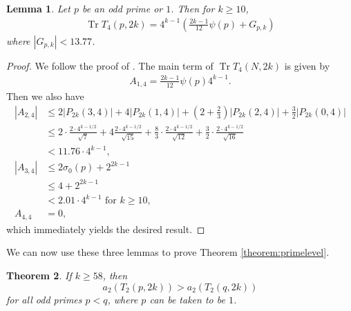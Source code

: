 \documentclass[11pt,letterpaper,reqno]{amsart}
\numberwithin{figure}{section}
\numberwithin{table}{section}
\theoremstyle{definition}
\theoremstyle{plain}
\newcommand{\lrp}[1]{\left(#1\right)}
\newtheorem{theorem}{Theorem}[section]
\newtheorem{lemma}[theorem]{Lemma}
\theoremstyle{definition}
\theoremstyle{definition}
\theoremstyle{remark}
\numberwithin{equation}{section}
\DeclareMathOperator{\Tr}{Tr}
\begin{document}
\begin{lemma} \label{lem:primeT4}
    Let $p$ be an odd prime or $1$. Then for $k\ge10$,
   \begin{align}
          \Tr T_4(p, 2k) = 4^{k-1} \lrp{ \frac{2k-1}{12}\psi(p) +G_{p,k} }
    \end{align} 
    where $|G_{p,k}|< 13.77$.
\end{lemma}
\begin{proof}
 We follow the proof of \cite[Proposition 4.7]{previousPaper}. The main term of  $\Tr T_4(N, 2k) $ is given by
    \begin{align}
        A_{1,4}=\frac{2k-1}{12}\psi(p) 4^{k-1}.
    \end{align}
    Then we also have
    \begin{align}
        |A_{2,4}|&\le 2|P_{2k}(3,4)|+4 |P_{2k}(1,4)|+\left(2+\frac{2}{3}\right)|P_{2k}(2,4)|+\frac{3}{2}|P_{2k}(0,4)|\\
        &\le 2\cdot \frac{2\cdot 4^{k-1/2}}{\sqrt{7}}+4\frac{2\cdot 4^{k-1/2}}{\sqrt{15}}+\frac{8}{3}\cdot \frac{2\cdot 4^{k-1/2}}{\sqrt{12}}+\frac{3}{2}\cdot\frac{2\cdot 4^{k-1/2}}{\sqrt{16}}\\
        &< 11.76 \cdot 4^{k-1}, \\
        |A_{3,4}|&\le 2\sigma_0(p)+2^{2k-1} \\
        &\le4+2^{2k-1} \\
        &< 2.01 \cdot 4^{k-1}  \text{ for } k\ge 10, \\
        A_{4,4} &= 0 ,
    \end{align}
    which immediately yields the desired result.
\end{proof}

We can now use these three lemmas to prove  Theorem \ref{theorem:primelevel}.



{
\renewcommand{\thetheorem}{\ref{theorem:primelevel}}
\begin{theorem} 
 If $k\ge 58$, then
    \begin{equation}
      a_{2}(T_2(p,2k))> a_{2}(T_2(q,2k))
    \end{equation}
 for all odd primes $p< q$, where $p$ can be taken to be $1$.
\end{theorem}
\addtocounter{theorem}{-1}
}
\end{document}
